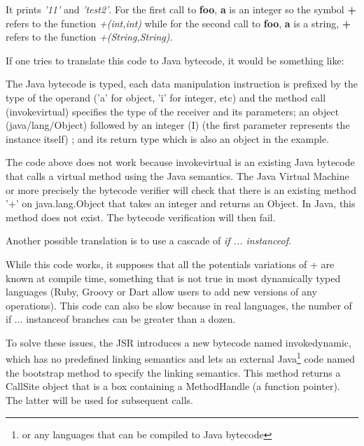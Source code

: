 \documentclass{sig-alternate}
\def \Jsr{JSR\xspace}
\begin{document}
      

      It prints {\it '11'} and {\it 'test2'}.
      For the first call to {\bf foo}, {\bf a} is an integer so the symbol {\bf +} refers
      to the function {\it +(int,int)} while for the second call to {\bf foo}, {\bf a} is a string, {\bf +} refers to the function {\it +(String,String)}.

      If one tries to translate this code to Java bytecode, it would be something like:

      

      The Java bytecode is typed, each data manipulation instruction is prefixed 
      by the type of the operand ('a' for object, 'i' for integer, etc)
      and the method call (invokevirtual) specifies the type of the receiver and its parameters;
      an object (java/lang/Object) followed by an integer (I) (the first parameter represents the instance itself) ; and its return type
      which is also an object in the example.

      The code above does not work because invokevirtual is an existing Java bytecode that calls a virtual method using the Java semantics.
      The Java Virtual Machine or more precisely the bytecode verifier will check that
      there is an existing method '+' on java.lang.Object that takes an integer and returns an Object.
      In Java, this method does not exist. The bytecode verification will then fail.

      Another possible translation is to use a cascade of \emph{if ... instanceof}.

      \vspace{1em}

      

      While this code works, it supposes that all the potentials variations of + are known at compile time,
      something that is not true in most dynamically typed languages (Ruby, Groovy or Dart allow users to add
      new versions of any operations).
      This code can also be slow because in real languages, the number of if ... instanceof branches
      can be greater than a dozen. 

      To solve these issues, the \Jsr introduces a new bytecode named invokedynamic, which has no predefined
      linking semantics and lets an external Java\footnote{or any languages that can be compiled to Java bytecode} code
      named the bootstrap method to specify the linking semantics.
      This method returns a CallSite object that is a box containing a MethodHandle (a function pointer).
      The latter will be used for subsequent calls.
\end{document}
